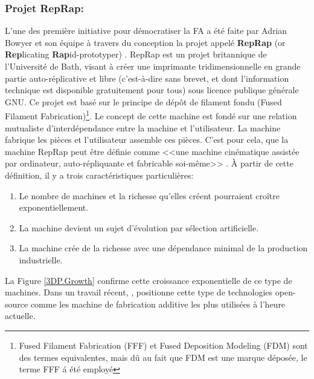 \subsubsection*{Projet RepRap:}
L'une des première initiative pour démocratiser la FA a été faite par Adrian Bowyer et son équipe à travers du conception la projet appelé \textbf{RepRap} (or \textbf{Rep}licating \textbf{Rap}id-prototyper) \parencite{HollandDO'DonnellG.Bennett2010a, Bailard2007, Jones2011}.
RepRap  est un projet britannique de l’Université de Bath, visant à créer une imprimante tridimensionnelle en grande partie auto-réplicative et libre (c’est-à-dire sans brevet, et dont  l'information technique est disponible gratuitement pour tous) sous licence  publique générale GNU.
Ce projet est basé sur le principe de dépôt de filament fondu (Fused Filament Fabrication)\footnote{Fused Filament Fabrication (FFF) et Fused Deposition Modeling (FDM) sont des termes equivalentes, mais dû au fait que FDM est une marque déposée, le terme FFF á été employé}.
Le concept de cette machine est fondé sur une relation mutualiste d’interdépendance entre la machine et l’utilisateur. La machine fabrique les pièces et l’utilisateur assemble ces pièces. 
C'est pour cela, que la machine RepRap peut être définie comme <<une machine cinématique assistée par ordinateur, auto-répliquante et fabricable soi-même>> \parencite{Jones2011}.
À partir de cette définition, il y a trois caractéristiques particulières:


\begin{enumerate}[noitemsep]
	\item Le nombre de machines et la richesse qu’elles créent pourraient croître exponentiellement. 
	\item La machine devient un sujet d’évolution par sélection artificielle.  
	\item La machine crée de la richesse avec une dépendance minimal de la production industrielle.
\end{enumerate}

La Figure \ref{3DP.Growth} confirme cette croissance exponentielle de ce type de machines.
Dans un travail récent, \textcite{Ford2014}, positionne cette type de technologies open-source comme les machine de fabrication additive les plus utilisées à l'heure actuelle.

